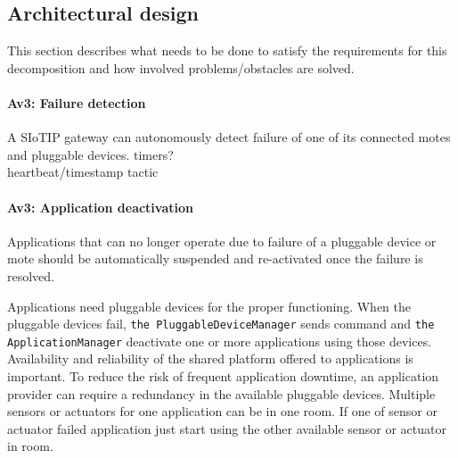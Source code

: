 \subsection{Architectural design}\label{sec:architectural-design}
    This section describes what needs to be done to satisfy the requirements for
    this decomposition and how involved problems/obstacles are solved.

    \paragraph{Av3: Failure detection}
        A SIoTIP gateway can autonomously detect failure of one of its
        connected motes and pluggable devices.
        timers? \\
        heartbeat/timestamp tactic

    \paragraph{Av3: Application deactivation}
        Applications that can no longer operate due to failure of a pluggable
        device or mote should be automatically suspended and re-activated once the failure is resolved.

        Applications need pluggable devices for the proper functioning.
        When the pluggable devices fail, \texttt{the PluggableDeviceManager} sends
        command and \texttt{the ApplicationManager} deactivate one or more applications
        using those devices. Availability and reliability of the shared platform offered to applications is
        important. To reduce the risk of frequent application downtime,
        an application provider can require a redundancy in the available
        pluggable devices. Multiple sensors or actuators for one application can be in one room.
        If one of sensor or actuator failed application just start using
        the other available sensor or actuator in room.

